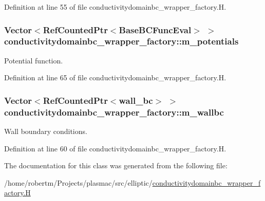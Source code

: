 Definition at line 55 of file conductivitydomainbc\+\_\+wrapper\+\_\+factory.\+H.

\subsubsection[{\texorpdfstring{m\+\_\+potentials}{m_potentials}}]{\setlength{\rightskip}{0pt plus 5cm}Vector$<$Ref\+Counted\+Ptr$<$Base\+B\+C\+Func\+Eval$>$ $>$ conductivitydomainbc\+\_\+wrapper\+\_\+factory\+::m\+\_\+potentials\hspace{0.3cm}{\ttfamily [protected]}}\hypertarget{classconductivitydomainbc__wrapper__factory_a58bfcbec50ffbb54076121621b30e71c}{}\label{classconductivitydomainbc__wrapper__factory_a58bfcbec50ffbb54076121621b30e71c}


Potential function. 



Definition at line 65 of file conductivitydomainbc\+\_\+wrapper\+\_\+factory.\+H.

\subsubsection[{\texorpdfstring{m\+\_\+wallbc}{m_wallbc}}]{\setlength{\rightskip}{0pt plus 5cm}Vector$<$Ref\+Counted\+Ptr$<${\bf wall\+\_\+bc}$>$ $>$ conductivitydomainbc\+\_\+wrapper\+\_\+factory\+::m\+\_\+wallbc\hspace{0.3cm}{\ttfamily [protected]}}\hypertarget{classconductivitydomainbc__wrapper__factory_ae53d1a626f3d14a045eddbb20e28f723}{}\label{classconductivitydomainbc__wrapper__factory_ae53d1a626f3d14a045eddbb20e28f723}


Wall boundary conditions. 



Definition at line 60 of file conductivitydomainbc\+\_\+wrapper\+\_\+factory.\+H.



The documentation for this class was generated from the following file\+:\begin{DoxyCompactItemize}
\item 
/home/robertm/\+Projects/plasmac/src/elliptic/\hyperlink{conductivitydomainbc__wrapper__factory_8H}{conductivitydomainbc\+\_\+wrapper\+\_\+factory.\+H}\end{DoxyCompactItemize}
